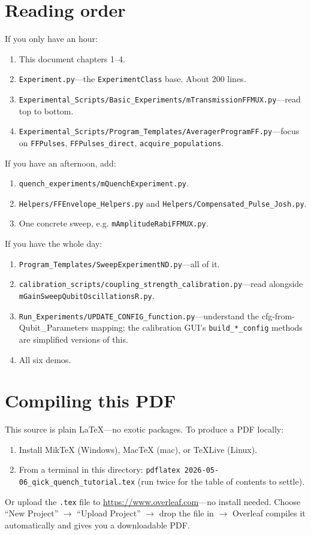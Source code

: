 \documentclass[11pt,letterpaper]{article}
\begin{document}
\section{Reading order}
If you only have an hour:
\begin{enumerate}[leftmargin=*]
  \item This document chapters 1--4.
  \item \texttt{Experiment.py}---the \texttt{ExperimentClass} base. About 200 lines.
  \item \texttt{Experimental\_Scripts/Basic\_Experiments/mTransmissionFFMUX.py}---read top to bottom.
  \item \texttt{Experimental\_Scripts/Program\_Templates/AveragerProgramFF.py}---focus on \texttt{FFPulses}, \texttt{FFPulses\_direct}, \texttt{acquire\_populations}.
\end{enumerate}

If you have an afternoon, add:
\begin{enumerate}[leftmargin=*,resume]
  \item \texttt{quench\_experiments/mQuenchExperiment.py}.
  \item \texttt{Helpers/FFEnvelope\_Helpers.py} and \texttt{Helpers/Compensated\_Pulse\_Josh.py}.
  \item One concrete sweep, e.g. \texttt{mAmplitudeRabiFFMUX.py}.
\end{enumerate}

If you have the whole day:
\begin{enumerate}[leftmargin=*,resume]
  \item \texttt{Program\_Templates/SweepExperimentND.py}---all of it.
  \item \texttt{calibration\_scripts/coupling\_strength\_calibration.py}---read alongside \texttt{mGainSweepQubitOscillationsR.py}.
  \item \texttt{Run\_Experiments/UPDATE\_CONFIG\_function.py}---understand the cfg-from-Qubit\_Parameters mapping; the calibration GUI's \texttt{build\_*\_config} methods are simplified versions of this.
  \item All six demos.
\end{enumerate}

\section{Compiling this PDF}
This source is plain LaTeX---no exotic packages. To produce a PDF locally:
\begin{enumerate}[leftmargin=*]
  \item Install MikTeX (Windows), MacTeX (mac), or TeXLive (Linux).
  \item From a terminal in this directory: \texttt{pdflatex 2026-05-06\_qick\_quench\_tutorial.tex} (run twice for the table of contents to settle).
\end{enumerate}
Or upload the \texttt{.tex} file to \url{https://www.overleaf.com}---no install needed. Choose ``New Project'' \(\to\) ``Upload Project'' \(\to\) drop the file in \(\to\) Overleaf compiles it automatically and gives you a downloadable PDF.
\end{document}
